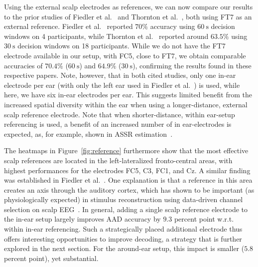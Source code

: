 \documentclass[fleqn,10pt]{wlscirep}
\begin{document}
	Using the external scalp electrodes as references, we can now compare our results to the prior studies of Fiedler et al.~\cite{fiedler2017single} and Thornton et al.~\cite{thornton2024comparison}, both using FT7 as an external reference. Fiedler et al.~\cite{fiedler2017single} reported $70\%$ accuracy using $\SI{60}{\second}$ decision windows on 4 participants, while Thornton et al.~\cite{thornton2024comparison} reported around $63.5\%$ using $\SI{30}{\second}$ decision windows on 18 participants. While we do not have the FT7 electrode available in our setup, with FC5, close to FT7, we obtain comparable accuracies of $70.4\%$ ($\SI{60}{\second}$) and $64.9\%$ ($\SI{30}{\second}$), confirming the results found in these respective papers. Note, however, that in both cited studies, only one in-ear electrode per ear (with only the left ear used in Fiedler et al.~\cite{fiedler2017single}) is used, while here, we have six in-ear electrodes per ear. This suggests limited benefit from the increased spatial diversity within the ear when using a longer-distance, external scalp reference electrode. Note that when shorter-distance, within ear-setup referencing is used, a benefit of an increased number of in ear-electrodes is expected, as, for example, shown in ASSR estimation~\cite{sergeeva2022investigation}.
	
	The heatmaps in Figure~\ref{fig:reference} furthermore show that the most effective scalp references are located in the left-lateralized fronto-central areas, with highest performances for the electrodes FC5, C3, FC1, and Cz. A similar finding was established in Fiedler et al.~\cite{fiedler2017single}. One explanation is that a reference in this area creates an axis through the auditory cortex, which has shown to be important (as physiologically expected) in stimulus reconstruction using data-driven channel selection on scalp EEG~\cite{mirkovic2015decoding,narayanan2020analysis,narayanan2021eeg,nguyen2024aadnet}. In general, adding a single scalp reference electrode to the in-ear setup largely improves AAD accuracy by $9.3$ percent point w.r.t. within in-ear referencing. Such a strategically placed additional electrode thus offers interesting opportunities to improve decoding, a strategy that is further explored in the next section. For the around-ear setup, this impact is smaller ($5.8$ percent point), yet substantial.
	
\end{document}
